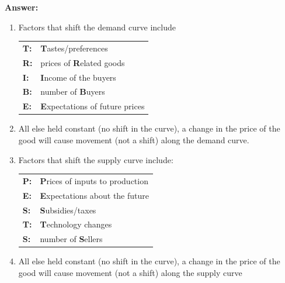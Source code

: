 \documentclass[12pt]{article}
\begin{document}
\textbf{Answer:}
\begin{enumerate}
\item  Factors that shift the demand curve include
\begin{center}
\begin{tabular}{ll}
\textbf{T: }& \textbf{T}astes/preferences \\
\textbf{R: }& prices of \textbf{R}elated goods \\
\textbf{I:} & \textbf{I}ncome of the buyers \\ 
\textbf{B:} & number of \textbf{B}uyers \\
\textbf{E: }& \textbf{E}xpectations of future prices \\
\end{tabular}
\end{center}

\item All else held constant (no shift in the curve), a change in the price of the good will cause movement (not a shift) along the demand curve.

\item Factors that shift the supply curve include:
\begin{center}
\begin{tabular}{ll}
\textbf{P:} & \textbf{P}rices of inputs to production \\
\textbf{E:} & \textbf{E}xpectations about the future \\
\textbf{S:}& \textbf{S}ubsidies/taxes \\
\textbf{T:} & \textbf{T}echnology changes \\
\textbf{S:}& number of \textbf{S}ellers \\
\end{tabular}
\end{center}

\item All else held constant (no shift in the curve), a change in the price of the good will cause movement (not a shift) along the supply curve
\end{enumerate}
\end{document}
